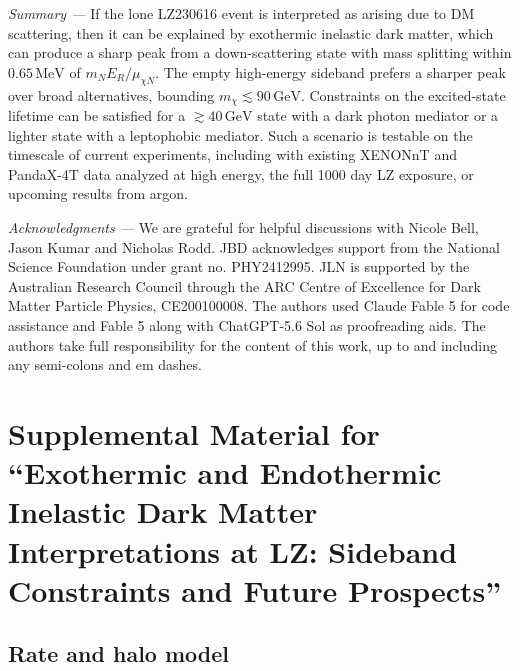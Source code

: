 \documentclass[aps,prl,twocolumn,superscriptaddress,nofootinbib,floatfix,longbibliography]{revtex4-2}
\newcommand{\MeV}{\ensuremath{\,\mathrm{MeV}}}
\newcommand{\GeV}{\ensuremath{\,\mathrm{GeV}}}
\newcommand{\ER}{\ensuremath{E_R}}
\newcommand{\mchi}{\ensuremath{m_\chi}}
\begin{document}
\emph{Summary ---}
If the lone LZ230616 event is interpreted as arising due to DM scattering, then it can be explained by exothermic inelastic dark matter, which can produce a sharp peak from a down-scattering state with mass splitting within $0.65\MeV$ of $m_N\ER/\mu_{\chi N}$. The empty high-energy sideband prefers a sharper peak over broad alternatives, bounding $\mchi \lesssim 90\GeV$. Constraints on the excited-state lifetime can be satisfied for a $\gtrsim40\GeV$ state with a dark photon mediator or a lighter state with a leptophobic mediator. Such a scenario is testable on the timescale of current experiments, including with existing XENONnT and PandaX-4T data analyzed at high energy, the full 1000 day LZ exposure, or upcoming results from argon. 

\begin{acknowledgments}

\emph{Acknowledgments ---} We are grateful for helpful discussions with Nicole Bell, Jason Kumar and Nicholas Rodd. JBD acknowledges support
from the National Science Foundation under grant no. PHY2412995. JLN is supported by the Australian Research Council through the ARC Centre of Excellence for Dark Matter Particle Physics, CE200100008. The authors used Claude Fable 5 for code assistance and Fable 5 along with ChatGPT-5.6 Sol as proofreading aids. The authors take full responsibility for the content of this work, up to and including any semi-colons and em dashes.
\end{acknowledgments}



\clearpage
\onecolumngrid
\section{Supplemental Material for ``Exothermic and Endothermic  Inelastic Dark Matter Interpretations at LZ: Sideband Constraints and Future Prospects''}


\subsection{Rate and halo model}
\end{document}
